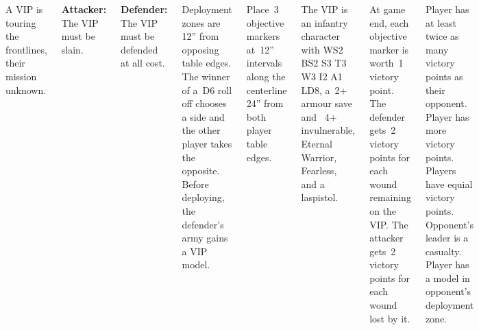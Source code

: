 
\begin{columns}

  A VIP is touring the frontlines, their mission unknown.

  {\bf Attacker:} The VIP must be slain.

  {\bf Defender:} The VIP must be defended at all cost.

%

Deployment zones are 12'' from opposing table edges.  The winner of
a~D6 roll off chooses a side and the other player takes the opposite.
Before deploying, the defender's army gains a VIP model.

Place~3 objective markers at~12'' intervals along the centerline 24''
from both player table edges.

%

The VIP is an infantry character with WS2 BS2 S3 T3 W3 I2 A1 LD8, a~2+
armour save and ~4+ invulnerable, Eternal Warrior, Fearless, and a
laspistol.

At game end, each objective marker is worth~1 victory point.  The
defender gets~2 victory points for each wound remaining on the VIP.
The attacker gets~2 victory points for each wound lost by it.

\scoringbox%
{Player has at least twice as many victory points as their opponent.}%
{Player has more victory points.}%
{Players have equial victory points.}%
{Opponent's leader is a casualty.}%
{Player has a model in opponent's deployment zone.}

\end{columns}
